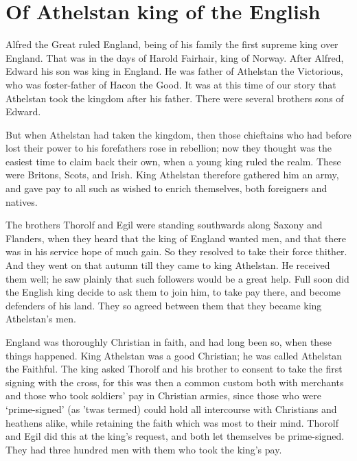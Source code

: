 \chapter{Of Athelstan king of the English}

Alfred the Great ruled England, being of his family the first supreme king over England. That was in the days of Harold Fairhair, king of Norway. After Alfred, Edward his son was king in England. He was father of Athelstan the Victorious, who was foster-father of Hacon the Good. It was at this time of our story that Athelstan took the kingdom after his father. There were several brothers sons of Edward.

But when Athelstan had taken the kingdom, then those chieftains who had before lost their power to his forefathers rose in rebellion; now they thought was the easiest time to claim back their own, when a young king ruled the realm. These were Britons, Scots, and Irish. King Athelstan therefore gathered him an army, and gave pay to all such as wished to enrich themselves, both foreigners and natives.

The brothers Thorolf and Egil were standing southwards along Saxony and Flanders, when they heard that the king of England wanted men, and that there was in his service hope of much gain. So they resolved to take their force thither. And they went on that autumn till they came to king Athelstan. He received them well; he saw plainly that such followers would be a great help. Full soon did the English king decide to ask them to join him, to take pay there, and become defenders of his land. They so agreed between them that they became king Athelstan's men.

England was thoroughly Christian in faith, and had long been so, when these things happened. King Athelstan was a good Christian; he was called Athelstan the Faithful. The king asked Thorolf and his brother to consent to take the first signing with the cross, for this was then a common custom both with merchants and those who took soldiers' pay in Christian armies, since those who were `prime-signed' (as 'twas termed) could hold all intercourse with Christians and heathens alike, while retaining the faith which was most to their mind. Thorolf and Egil did this at the king's request, and both let themselves be prime-signed. They had three hundred men with them who took the king's pay.
